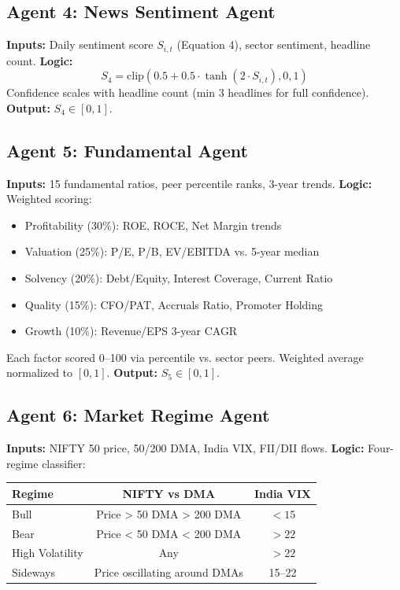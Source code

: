 \documentclass[12pt,a4paper]{report}
\begin{document}
\subsection{Agent 4: News Sentiment Agent}
\textbf{Inputs:} Daily sentiment score $S_{i,t}$ (Equation 4), sector sentiment, headline count.
\textbf{Logic:}
\begin{equation}
    S_4 = \text{clip}\left(0.5 + 0.5 \cdot \tanh(2 \cdot S_{i,t}), 0, 1\right)
\end{equation}
Confidence scales with headline count (min 3 headlines for full confidence).
\textbf{Output:} $S_4 \in [0, 1]$.

\subsection{Agent 5: Fundamental Agent}
\textbf{Inputs:} 15 fundamental ratios, peer percentile ranks, 3-year trends.
\textbf{Logic:} Weighted scoring:
\begin{itemize}
    \item Profitability (30\%): ROE, ROCE, Net Margin trends
    \item Valuation (25\%): P/E, P/B, EV/EBITDA vs. 5-year median
    \item Solvency (20\%): Debt/Equity, Interest Coverage, Current Ratio
    \item Quality (15\%): CFO/PAT, Accruals Ratio, Promoter Holding
    \item Growth (10\%): Revenue/EPS 3-year CAGR
\end{itemize}
Each factor scored 0--100 via percentile vs. sector peers. Weighted average normalized to $[0, 1]$.
\textbf{Output:} $S_5 \in [0, 1]$.

\subsection{Agent 6: Market Regime Agent}
\textbf{Inputs:} NIFTY 50 price, 50/200 DMA, India VIX, FII/DII flows.
\textbf{Logic:} Four-regime classifier:
\begin{center}
\begin{tabular}{lcc}
\toprule
\textbf{Regime} & \textbf{NIFTY vs DMA} & \textbf{India VIX} \\
\midrule
Bull & Price > 50 DMA > 200 DMA & $< 15$ \\
Bear & Price < 50 DMA < 200 DMA & $> 22$ \\
High Volatility & Any & $> 22$ \\
Sideways & Price oscillating around DMAs & 15--22 \\
\bottomrule
\end{tabular}
\end{center}
\end{document}
